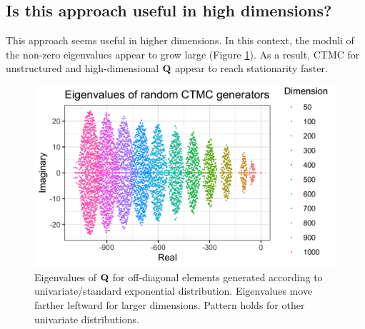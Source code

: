 \documentclass[12pt]{article} %
\begin{document}
\subsection{Is this approach useful in high dimensions?}

This approach seems useful in higher dimensions.  In this context, the moduli of the non-zero eigenvalues appear to grow large (Figure \ref{fig:eigenvalues}).  As a result, CTMC for unstructured and high-dimensional $\mathbf{Q}$ appear to reach stationarity faster.

\begin{figure}[!t]
	\centering
	\includegraphics[width=0.9\linewidth]{eigenvaluesPlot.png}
	\caption{Eigenvalues of $\mathbf{Q}$ for off-diagonal elements generated according to univariate/standard exponential distribution. Eigenvalues move farther leftward for larger dimensions.  Pattern holds for other univariate distributions.}\label{fig:eigenvalues}
\end{figure}

%
%
\end{document}
